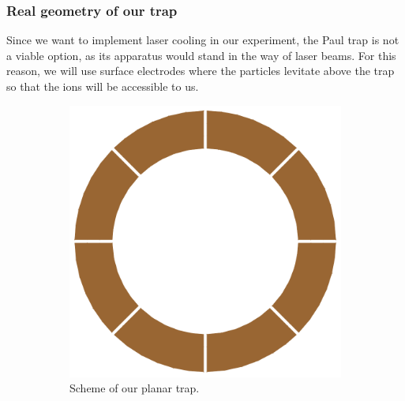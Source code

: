 \subsubsection{Real geometry of our trap}
Since we want to implement laser cooling in our experiment, the Paul trap is not a viable option, as its apparatus would stand in the way of laser beams. For this reason, we will use surface electrodes where the particles levitate above the trap so that the ions will be accessible to us.
\begin{figure}[H]
\begin{subfigure}{.5\textwidth}
  \centering
  \includegraphics[width=\linewidth]{img/real_trap_geometry_1.pdf}
  \caption{Scheme of our planar trap.}
  \label{fig:Real trap geometry 1}
\end{subfigure}%
\begin{subfigure}{.5\textwidth}
  \centering

\end{subfigure}
\end{figure}
